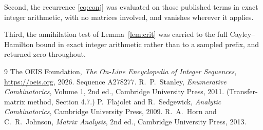 \documentclass[11pt,a4paper]{article}
\theoremstyle{plain}
\theoremstyle{definition}
\begin{document}
Second, the recurrence \eqref{eq:conj} was evaluated on those published terms in exact
integer arithmetic, with no matrices involved, and vanishes wherever it applies.

Third, the annihilation test of Lemma~\ref{lem:crit} was carried to the full
Cayley--Hamilton bound in exact integer arithmetic rather than to a sampled prefix, and
returned zero throughout.

\begin{thebibliography}{9}
 The OEIS Foundation, \emph{The On-Line Encyclopedia of Integer
Sequences}, \url{https://oeis.org}, 2026. Sequence A278277.
 R.~P.~Stanley, \emph{Enumerative Combinatorics}, Volume 1, 2nd ed.,
Cambridge University Press, 2011. (Transfer-matrix method, Section 4.7.)
 P.~Flajolet and R.~Sedgewick, \emph{Analytic Combinatorics}, Cambridge
University Press, 2009.
 R.~A.~Horn and C.~R.~Johnson, \emph{Matrix Analysis}, 2nd ed., Cambridge
University Press, 2013.
\end{thebibliography}
\end{document}
